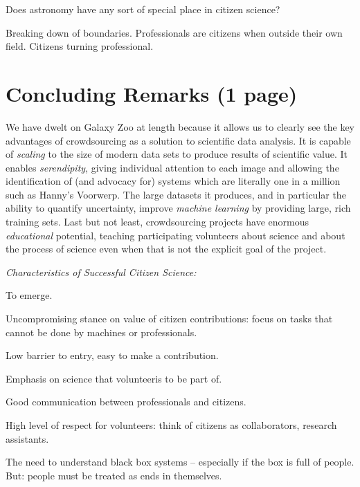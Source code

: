 \documentclass{ar2e}
\begin{document}
Does astronomy have any sort of special place in citizen science?

Breaking down of boundaries. Professionals are citizens when outside their own
field. Citizens turning professional.


\section{Concluding Remarks (1 page)}
\label{sec:conclusions}


We have dwelt on Galaxy Zoo at length because it allows us to clearly see the
key advantages of crowdsourcing as a solution to scientific data analysis. It
is capable of \emph{scaling} to the size of modern data sets to produce
results of scientific value. It enables \emph{serendipity}, giving individual
attention to each image and allowing the identification of (and advocacy for)
systems which are literally one in a million such as Hanny's Voorwerp. The
large datasets it produces, and in particular the ability to quantify
uncertainty, improve \emph{machine learning} by providing large, rich training
sets. Last but not least, crowdsourcing projects have enormous
\emph{educational} potential, teaching participating volunteers about science
and about the process of science even when that is not the explicit goal of
the project. 


{\it Characteristics of Successful Citizen Science:}

To emerge.

Uncompromising stance on value of citizen contributions: focus on tasks that
cannot be done by machines or professionals.

Low barrier to entry, easy to make a contribution.

Emphasis on science that volunteeris to be part of. 

Good communication between professionals and citizens.

High level of respect for volunteers: think of citizens as collaborators,
research assistants.

The need to understand black box systems -- especially if the box is full of
people. But: people must be treated as ends in themselves. 

\end{document}
